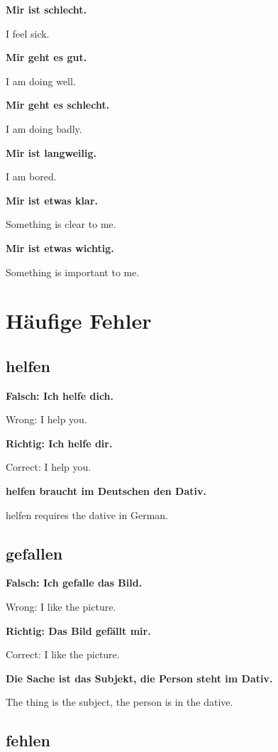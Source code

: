 \documentclass[a4paper]{article}
\newcommand{\EN}[1]{\par{\small\textcolor{TranslationGray}{#1}}\vspace{0.4em}}
\begin{document}
        \textbf{Mir ist schlecht.}
        \EN{I feel sick.}
        
        \textbf{Mir geht es gut.}
        \EN{I am doing well.}
        
        \textbf{Mir geht es schlecht.}
        \EN{I am doing badly.}
        
        \textbf{Mir ist langweilig.}
        \EN{I am bored.}
        
        \textbf{Mir ist etwas klar.}
        \EN{Something is clear to me.}
        
        \textbf{Mir ist etwas wichtig.}
        \EN{Something is important to me.}
    
    
    \section{Häufige Fehler}
        
        \subsection{helfen}
            
            \textbf{Falsch: Ich helfe dich.}
            \EN{Wrong: I help you.}
            
            \textbf{Richtig: Ich helfe dir.}
            \EN{Correct: I help you.}
            
            \textbf{helfen braucht im Deutschen den Dativ.}
            \EN{helfen requires the dative in German.}
        
        \subsection{gefallen}
            
            \textbf{Falsch: Ich gefalle das Bild.}
            \EN{Wrong: I like the picture.}
            
            \textbf{Richtig: Das Bild gefällt mir.}
            \EN{Correct: I like the picture.}
            
            \textbf{Die Sache ist das Subjekt, die Person steht im Dativ.}
            \EN{The thing is the subject, the person is in the dative.}
        
        \subsection{fehlen}
            
\end{document}
